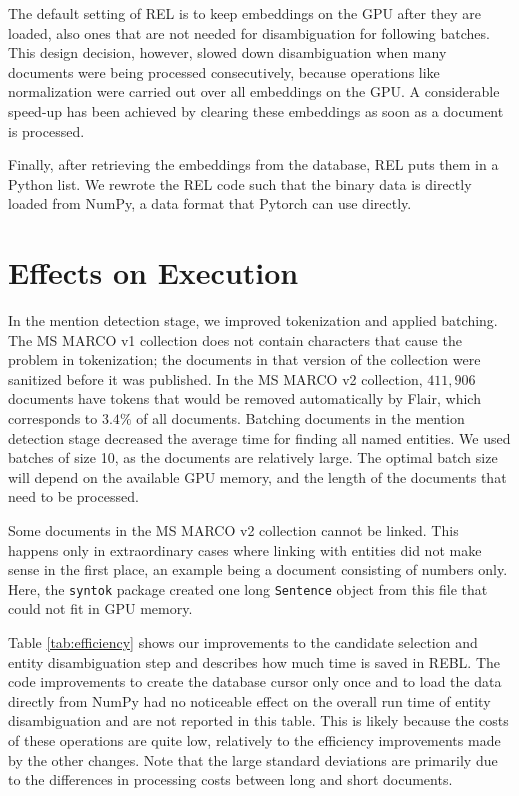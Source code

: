 The default setting of REL is to keep embeddings on the GPU after they are loaded, also ones that are not needed for disambiguation for following batches.
This design decision, however, slowed down disambiguation when many documents were being processed consecutively, because operations like normalization were carried out over all embeddings on the GPU. 
A considerable speed-up has been achieved by clearing these embeddings as soon as a document is processed.

Finally, after retrieving the embeddings from the database, REL puts them in a Python list. We rewrote the REL code such that the binary data is directly loaded from NumPy, a data format that Pytorch can use directly. 

\section{Effects on Execution}
In the mention detection stage, we improved tokenization and applied batching. The MS MARCO v1 collection does not contain characters that cause the problem in tokenization; the documents in that version of the collection were sanitized before it was published. In the MS MARCO v2 collection, $411,906$ documents have tokens that would be removed automatically by Flair, which corresponds to $3.4\%$ of all documents.
Batching documents in the mention detection stage decreased the average time for finding all named entities. We used batches of size 10, as the documents are relatively large. The optimal batch size will depend on the available GPU memory, and the length of the documents that need to be processed.

Some documents in the MS MARCO v2 collection cannot be linked. This happens only in extraordinary cases where linking with entities did not make sense in the first place, an example being a document consisting of numbers only. Here, the \texttt{syntok} package created one long \texttt{Sentence} object from this file that could not fit in GPU memory.

Table \ref{tab:efficiency} shows our improvements to the candidate selection and entity disambiguation step and describes how much time is saved in REBL. 
The code improvements to create the database cursor only once and to load the data directly from NumPy had no noticeable effect on the overall run time of entity disambiguation and are not reported in this table. This is likely because the costs of these operations are quite low, relatively to the efficiency improvements made by the other changes.
Note that the large standard deviations are primarily due to the differences in processing costs between long and short documents.


